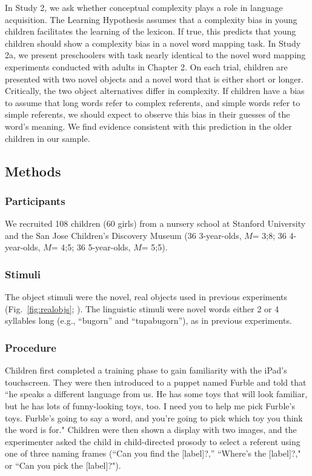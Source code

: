 In Study 2, we ask whether conceptual complexity  plays a role in language acquisition. The Learning Hypothesis assumes that a complexity bias in young children facilitates the learning of the lexicon. If true, this predicts that young children should show a complexity bias in a novel word mapping task. In Study 2a, we present preschoolers with task nearly identical to the novel word mapping experiments conducted with adults in Chapter 2. On each trial, children are presented with two novel objects and a novel word that is either short or longer. Critically, the two object alternatives differ in complexity. If children have a bias to assume that long words refer to complex referents, and simple words refer to simple referents, we should expect to observe this bias in their guesses of the word's meaning.  We find evidence consistent with this prediction in the older children in our sample. 

\subsection{Methods}
\subsubsection{Participants} We recruited 108 children (60 girls) from a nursery school at Stanford University and the San Jose Children's Discovery Museum (36 3-year-olds, $M$= 3;8; 36 4-year-olds, $M$= 4;5; 36 5-year-olds, $M$= 5;5). 
\subsubsection{Stimuli} 
The object stimuli were the novel, real objects used in previous experiments (Fig.\ \ref{fig:realobjs};  \pageref{novelrealobjs}). The linguistic stimuli were novel words either 2 or 4 syllables long (e.g., ``bugorn'' and ``tupabugorn''), as in previous experiments.

\subsubsection{Procedure} 
Children first completed a training phase to gain familiarity with  the iPad's touchscreen. They were then introduced to a puppet named Furble and told that  ``he speaks a different language from us. He has some toys that will look familiar, but he has lots of funny-looking toys, too. I need you to help me pick Furble's toys. Furble's going to say a word, and you're going to pick which toy you think the word is for." Children were then shown a display with two images, and the experimenter  asked the child in child-directed prosody to select a referent using one of three naming frames (``Can you find the [label]?,'' ``Where's the [label]?,"  or ``Can you pick the [label]?").

